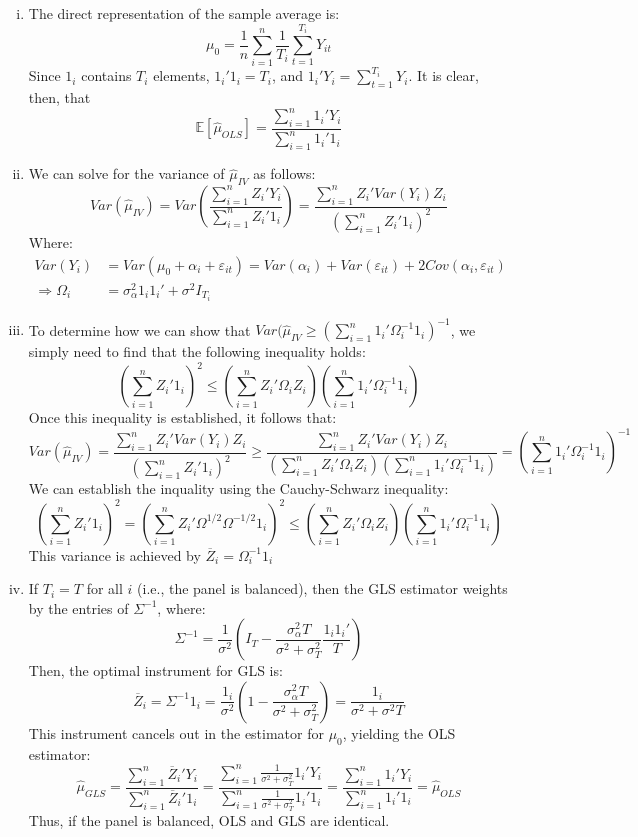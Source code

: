 \documentclass{article}
\newcommand{\sumn}{\sum_{i=1}^{n}}
\newcommand{\E}[1]{\mathbb{E}\left[#1\right]}%
\begin{document}
\begin{enumerate}[(i)]
	\item The direct representation of the sample average is:
		\[
			\mu_0 = \frac{1}{n}\sumn \frac{1}{T_i}\sum_{t=1}^{T_i} Y_{it}
		\]
		Since $1_i$ contains $T_i$ elements, ${1_i'1_i=T_i}$, and ${1_i'Y_i=\sum_{t=1}^{T_i}Y_i}$. It is clear, then, that
		\[
			\E{\hat{\mu}_{OLS}} = \frac{\sumn 1_i'Y_i}{\sumn1_i'1_i}
		\]
	
	
	\item We can solve for the variance of $\hat{\mu}_{IV}$ as follows:
		\[
			Var(\hat{\mu}_{IV})	= Var\left(\frac{\sumn Z_i'Y_i}{\sumn Z_i'1_i}\right) = \frac{\sumn Z_i'Var(Y_i)Z_i}{\left(\sumn Z_i'1_i\right)^2}	
		\]
		Where:
		\begin{align*}
						Var(Y_i) 	&= Var(\mu_0 + \alpha_i + \varepsilon_{it}) = Var(\alpha_i) + Var(\varepsilon_{it}) + 2Cov(\alpha_i,\varepsilon_{it})	\\
			\Rightarrow \Omega_i	&= \sigma^2_\alpha1_i1_i' + \sigma^2I_{T_i}
		\end{align*}
	
	
	\item To determine how we can show that ${Var(\hat{\mu}_{IV}\geq\left(\sumn 1_i'\Omega_i^{-1}1_i\right)^{-1}}$, we simply need to find that the following inequality holds:
		\[
			\left(\sumn Z_i'1_i\right)^2 \leq \left(\sumn Z_i'\Omega_iZ_i\right)\left(\sumn 1_i'\Omega_i^{-1}1_i\right)
		\]
		Once this inequality is established, it follows that:
		{\small \[
			Var(\hat{\mu}_{IV})	= 		\frac{\sumn Z_i'Var(Y_i)Z_i}{\left(\sumn Z_i'1_i\right)^2}
								\geq 	\frac{\sumn Z_i'Var(Y_i)Z_i}{\left(\sumn Z_i'\Omega_iZ_i\right)\left(\sumn 1_i'\Omega_i^{-1}1_i\right)}
								= 		\left(\sumn 1_i'\Omega_i^{-1}1_i\right)^{-1}
		\] }
		We can establish the inquality using the Cauchy-Schwarz inequality:
		\[
			\left(\sumn Z_i'1_i\right)^2 = 		\left(\sumn Z_i'\Omega^{1/2}\Omega^{-1/2}1_i\right)^2  					
										 \leq 	\left(\sumn Z_i'\Omega_iZ_i\right)\left(\sumn 1_i'\Omega_i^{-1}1_i\right)
		\]
		This variance is achieved by ${\overline{Z}_i=\Omega_i^{-1}1_i}$
		
	\item If $T_i=T$ for all $i$ (i.e., the panel is balanced), then the GLS estimator weights by the entries of $\Sigma^{-1}$, where:
		\[
			\Sigma^{-1} = \frac{1}{\sigma^2}\left(I_T - \frac{\sigma^2_\alpha T}{\sigma^2 + \sigma^2_T}\frac{1_i1_i'}{T}\right)
		\]
		Then, the optimal instrument for GLS is:
		\[
			\overline{Z}_i	= \Sigma^{-1}1_i = \frac{1_i}{\sigma^2}\left(1 - \frac{\sigma^2_\alpha T}{\sigma^2 + \sigma^2_T}\right)
							= \frac{1_i}{\sigma^2 + \sigma^2T}
		\]
		This instrument cancels out in the estimator for $\mu_0$, yielding the OLS estimator:
		\[
			\hat{\mu}_{GLS} = \frac{\sumn \overline{Z}_i'Y_i}{\sumn\overline{Z}_i'1_i} 
							= \frac{\sumn \frac{1}{\sigma^2 + \sigma^2_T}1_i'Y_i}{\sumn\frac{1}{\sigma^2 + \sigma^2_T}1_i'1_i} 
							= \frac{\sumn 1_i'Y_i}{\sumn1_i'1_i} = \hat{\mu}_{OLS}
		\]
		Thus, if the panel is balanced, OLS and GLS are identical.
	

\end{enumerate}
\end{document}
